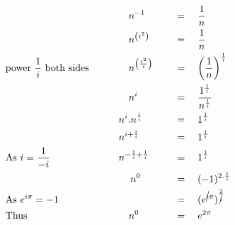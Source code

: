 \begin{alignat*}{5}
&\,&&\qquad n^{-1}&&\,\quad=\quad\frac{1}{n}\\
&\,&&\qquad n^{\left(i^2\right)}&&\,\quad=\quad\frac{1}{n}\\
&\mathrm{power}~\frac{1}{i}~\mathrm{both~sides}\quad&&\qquad n^{\left(\frac{i^2}{i}\right)} &&\,\quad=\quad\left(\frac{1}{n}\right)^\frac{1}{i}\\
&\,&&\qquad n^i&&\,\quad=\quad\frac{1^\frac{1}{i}}{n^\frac{1}{i}}\\
&\,&&\quad n^i.n^\frac{i}{i}&&\,\quad=\quad1^\frac{1}{i}\\
&\,&&\quad n^{i+\frac{i}{i}}&&\,\quad=\quad1^\frac{1}{i}\\
&\mathrm{As}~i=\frac{1}{-i}&&\quad n^{-\frac{1}{i}+\frac{1}{i}}&&\,\quad=\quad1^\frac{1}{i}\\
&\,&&\,\qquad n^0&&\,\quad=\quad(-1)^{2.\frac{1}{i}}\\
&\mathrm{As}~e^{i\pi}=-1&&\,&&\,\quad=\quad(e^{\cancel{i}\pi})^\frac{2}{\cancel{i}}\\
&\mathrm{Thus}&&\qquad n^0&&\,\quad=\quad e^{2\pi}\\
\end{alignat*}
